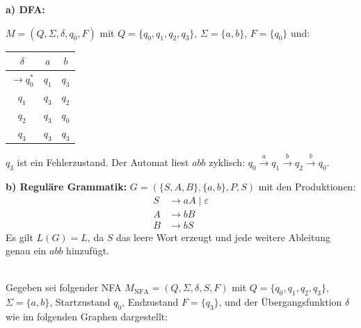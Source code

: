 \begin{loesung}
\textbf{a) DFA:}

$M = (Q, \Sigma, \delta, q_0, F)$ mit $Q = \{q_0, q_1, q_2, q_3\}$, $\Sigma = \{a,b\}$, $F = \{q_0\}$ und:

\begin{center}
\begin{tabular}{c|cc}
  $\delta$ & $a$ & $b$ \\
  \hline
  $\to q_0^*$ & $q_1$ & $q_3$ \\
  $q_1$ & $q_3$ & $q_2$ \\
  $q_2$ & $q_3$ & $q_0$ \\
  $q_3$ & $q_3$ & $q_3$ \\
\end{tabular}
\end{center}

$q_3$ ist ein Fehlerzustand. Der Automat liest $abb$ zyklisch: $q_0\xrightarrow{a}q_1\xrightarrow{b}q_2\xrightarrow{b}q_0$.

\textbf{b) Reguläre Grammatik:}
$G = (\{S, A, B\}, \{a,b\}, P, S)$ mit den Produktionen:
\begin{align*}
  S &\to aA \mid \varepsilon \\
  A &\to bB \\
  B &\to bS
\end{align*}
Es gilt $L(G) = L$, da $S$ das leere Wort erzeugt und jede weitere Ableitung genau ein $abb$ hinzufügt.
\end{loesung}

\\
Gegeben sei folgender NFA $M_\text{NFA} = (Q, \Sigma, \delta, S, F)$ mit $Q = \{q_0, q_1, q_2, q_3\}$, $\Sigma = \{a,b\}$, Startzustand $q_0$, Endzustand $F = \{q_3\}$, und der Übergangsfunktion $\delta$ wie im folgenden Graphen dargestellt:

\begin{center}
\end{center}

